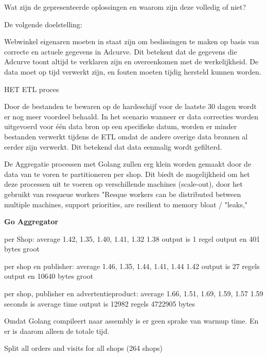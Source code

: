 Wat zijn de gepresenteerde oplossingen en waarom zijn deze volledig of niet?


De volgende doelstelling:

Webwinkel eigenaren moeten in staat zijn om beslissingen te maken op basis van correcte en actuele gegevens in Adcurve. Dit betekent dat de gegevens die Adcurve toont altijd te verklaren zijn en overeenkomen met de werkelijkheid. De data moet op tijd verwerkt zijn, en fouten moeten tijdig hersteld kunnen worden.

HET ETL proces

Door de bestanden te bewaren op de hardeschijf voor de laatste 30 dagen wordt er nog meer voordeel behaald.
In het scenario wanneer er data correcties worden uitgevoerd voor één data bron op een specifieke datum, worden er minder bestanden verwerkt tijdens de ETL omdat de andere overige data bronnen al eerder zijn verwerkt. Dit betekend dat data eenmalig wordt gefilterd.



De Aggregatie processen met Golang zullen erg klein worden gemaakt door de data van te voren te partitioneren per shop. Dit biedt de mogelijkheid om het deze processen uit te voeren op verschillende machines (scale-out), door het gebruikt van resqueue workers "Resque workers can be distributed between multiple machines, support priorities, are resilient to memory bloat / "leaks," \parencite{github2016reque} 




\textbf{Go Aggregator}


per Shop:
average 1.42, 1.35, 1.40, 1.41, 1.32
1.38
output is 1 regel output en 401 bytes groot

per shop en publisher:
average 1.46, 1.35, 1.44, 1.41, 1.44
1.42
output is 27 regels output en 10640 bytes groot


per shop, publisher en advertentieproduct:
average 1.66, 1.51, 1.69, 1.59, 1.57
1.59 seconds is average time
output is 12982 regels 4722905 bytes


Omdat Golang compileert naar assembly is er geen sprake van warmup time. En er is daarom alleen de totale tijd.


Split all orders and visits for all shops (264 shops)

